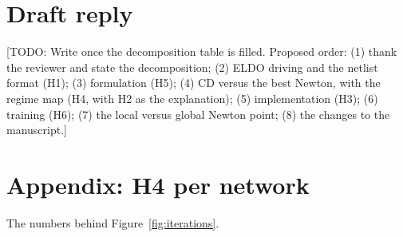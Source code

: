 \documentclass[11pt,a4paper]{article}
\newcommand{\todo}[1]{\textcolor{todoorange}{[TODO: #1]}}
\begin{document}

\section*{Draft reply}

\todo{Write once the decomposition table is filled. Proposed order: (1)
thank the reviewer and state the decomposition; (2) ELDO driving and the
netlist format (H1); (3) formulation (H5); (4) CD versus the best Newton,
with the regime map (H4, with H2 as the explanation); (5) implementation
(H3); (6) training (H6); (7) the local versus global Newton point; (8) the
changes to the manuscript.}

\section*{Appendix: H4 per network}

The numbers behind Figure~\ref{fig:iterations}.
\end{document}
